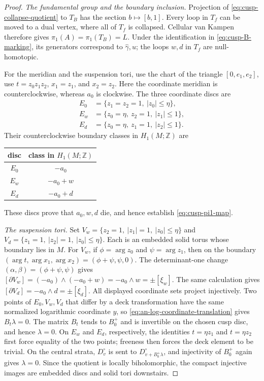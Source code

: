 \begin{proof}
\smallskip
\noindent\emph{The fundamental group and the boundary inclusion.}
Projection of \eqref{eq:cusp-collapse-quotient} to $T_B$ has the section
$b\mapsto[b,1]$.  Every loop in $T_f$ can be moved to a dual vertex,
where all of $T_f$ is collapsed.  Cellular van Kampen therefore gives
$\pi_1(A)=\pi_1(T_B)=L$.
Under the identification in \eqref{eq:cusp-B-marking}, its generators
correspond to $\widehat\gamma,u$; the loops $w,d$ in $T_f$ are
null-homotopic.

For the meridian and the suspension tori, use the chart of the
triangle $[0,e_1,e_2]$, use $t=z_0z_1z_2$, $x_1=z_1$, and
$x_2=z_2$.
Here the coordinate meridian is counterclockwise, whereas $a_0$ is
clockwise.  The three coordinate discs are
\[
 \begin{split}
 E_0&=\{z_1=z_2=1,\ |z_0|\le\eta\},\\
 E_w&=\{z_0=\eta,\ z_2=1,\ |z_1|\le1\},\\
 E_d&=\{z_0=\eta,\ z_1=1,\ |z_2|\le1\}.
 \end{split}
\]
Their counterclockwise boundary classes in $H_1(M;\mathbb Z)$ are
\begin{center}
\begin{tabular}{c@{\qquad}c}
\toprule
disc & class in $H_1(M;\mathbb Z)$\\
\midrule
$E_0$ & $-a_0$\\
$E_w$ & $-a_0+w$\\
$E_d$ & $-a_0+d$\\
\bottomrule
\end{tabular}
\end{center}
These discs prove that $a_0,w,d$ die, and hence establish
\eqref{eq:cusp-pi1-map}.

\smallskip
\noindent\emph{The suspension tori.}
Set $V_w=\{z_2=1,\ |z_1|=1,\ |z_0|\le\eta\}$ and
$V_d=\{z_1=1,\ |z_2|=1,\ |z_0|\le\eta\}$.
Each is an embedded solid torus whose boundary lies in $M$.
For $V_w$, if $\phi=\arg z_0$ and $\psi=\arg z_1$, then on the
boundary $(\arg t,\arg x_1,\arg x_2)=(\phi+\psi,\psi,0)$.
The determinant-one change $(\alpha,\beta)=(\phi+\psi,\psi)$ gives
$[\partial V_w]=(-a_0)\wedge(-a_0+w)
=-a_0\wedge w=\pm[\xi_w]$.
The same calculation gives
$[\partial V_d]=-a_0\wedge d=\pm[\xi_d]$.
All displayed coordinate sets project injectively.  Two points of
$E_0,V_w,V_d$ that differ by a deck transformation have the same normalized
logarithmic coordinate $y$, so \eqref{eq:an-log-coordinate-translation} gives
$B_t\lambda=0$.  The matrix $B_t$ tends to $B_0^+$ and is invertible on the
chosen cusp disc, and hence
$\lambda=0$.  On $E_w$ and $E_d$, respectively, the identities
$t=\eta z_1$ and $t=\eta z_2$ first force equality of the two points;
freeness then forces the deck element to be trivial.  On the central
strata, $D_v^\circ$ is sent to $D_{v+B_0^+\lambda}^\circ$, and
injectivity of $B_0^+$ again gives $\lambda=0$.  Since the quotient is
locally biholomorphic, the compact injective images are embedded discs and
solid tori downstairs.
\end{proof}

